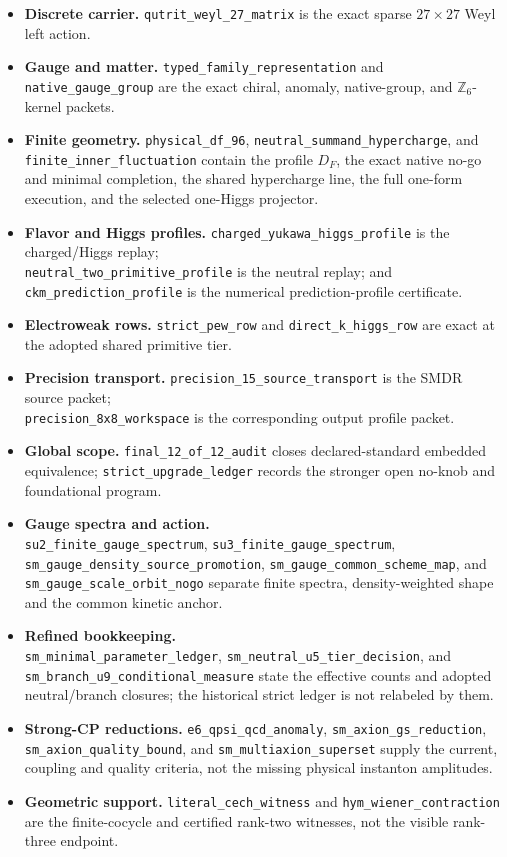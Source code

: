 \documentclass[11pt]{article}
\newcommand{\Z}{\mathbb{Z}}
\begin{document}
\begin{itemize}[leftmargin=*,itemsep=4pt]
\item \textbf{Discrete carrier.}
\nolinkurl{qutrit_weyl_27_matrix} is the exact sparse $27\times27$ Weyl left action.
\item \textbf{Gauge and matter.}
\nolinkurl{typed_family_representation} and \nolinkurl{native_gauge_group} are the exact
chiral, anomaly, native-group, and $\Z_6$-kernel packets.
\item \textbf{Finite geometry.}
\nolinkurl{physical_df_96}, \nolinkurl{neutral_summand_hypercharge}, and
\nolinkurl{finite_inner_fluctuation} contain the profile $D_F$, the exact native no-go and
minimal completion, the shared hypercharge line, the full one-form execution, and the selected
one-Higgs projector.
\item \textbf{Flavor and Higgs profiles.}
\nolinkurl{charged_yukawa_higgs_profile} is the charged/Higgs replay;\\
\nolinkurl{neutral_two_primitive_profile} is the neutral replay; and
\nolinkurl{ckm_prediction_profile} is the numerical prediction-profile certificate.
\item \textbf{Electroweak rows.}
\nolinkurl{strict_pew_row} and \nolinkurl{direct_k_higgs_row} are exact at the adopted shared
primitive tier.
\item \textbf{Precision transport.}
\nolinkurl{precision_15_source_transport} is the SMDR source packet;\\
\nolinkurl{precision_8x8_workspace} is the corresponding output profile packet.
\item \textbf{Global scope.}
\nolinkurl{final_12_of_12_audit} closes declared-standard embedded equivalence;
\nolinkurl{strict_upgrade_ledger} records the stronger open no-knob and foundational program.
\item \textbf{Gauge spectra and action.}\\
\nolinkurl{su2_finite_gauge_spectrum}, \nolinkurl{su3_finite_gauge_spectrum},\\
\nolinkurl{sm_gauge_density_source_promotion}, \nolinkurl{sm_gauge_common_scheme_map},
and \nolinkurl{sm_gauge_scale_orbit_nogo} separate finite spectra, density-weighted
shape and the common kinetic anchor.
\item \textbf{Refined bookkeeping.}\\
\nolinkurl{sm_minimal_parameter_ledger}, \nolinkurl{sm_neutral_u5_tier_decision}, and
\nolinkurl{sm_branch_u9_conditional_measure} state the effective counts and adopted
neutral/branch closures; the historical strict ledger is not relabeled by them.
\item \textbf{Strong-CP reductions.}
\nolinkurl{e6_qpsi_qcd_anomaly}, \nolinkurl{sm_axion_gs_reduction},
\nolinkurl{sm_axion_quality_bound}, and \nolinkurl{sm_multiaxion_superset} supply the
current, coupling and quality criteria, not the missing physical instanton amplitudes.
\item \textbf{Geometric support.}
\nolinkurl{literal_cech_witness} and \nolinkurl{hym_wiener_contraction} are the
finite-cocycle and certified rank-two witnesses, not the visible rank-three endpoint.
\end{itemize}
\end{document}
